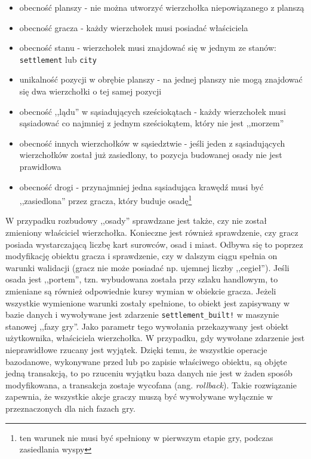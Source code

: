 \documentclass[11pt,twoside]{report}
\begin{document}
\begin{itemize}
\item obecność planszy - nie można utworzyć wierzchołka niepowiązanego
  z planszą
\item obecność gracza - każdy wierzchołek musi posiadać właściciela
\item obecność stanu - wierzchołek musi znajdować się w jednym ze
  stanów: \texttt{settlement} lub \texttt{city}
\item unikalność pozycji w obrębie planszy - na jednej planszy nie
  mogą znajdować się dwa wierzchołki o tej samej pozycji
\item obecność ,,lądu'' w sąsiadujących sześciokątach - każdy
  wierzchołek musi sąsiadować co najmniej z jednym sześciokątem, który
  nie jest ,,morzem''
\item obecność innych wierzchołków w sąsiedztwie - jeśli jeden z
  sąsiadujących wierzchołków został już zasiedlony, to pozycja
  budowanej osady nie jest prawidłowa
\item obecność drogi - przynajmniej jedna sąsiadująca krawędź musi być
  ,,zasiedlona'' przez gracza, który buduje osadę\footnote{ten warunek
    nie musi być spełniony w pierwszym etapie gry, podczas
    zasiedlania wyspy}
\end{itemize}

W przypadku rozbudowy ,,osady'' sprawdzane jest także, czy nie został
zmieniony właściciel wierzchołka. Konieczne jest również sprawdzenie,
czy gracz posiada wystarczającą liczbę kart surowców, osad i
miast. Odbywa się to poprzez modyfikację obiektu gracza i sprawdzenie,
czy w dalszym ciągu spełnia on warunki walidacji (gracz nie może
posiadać np. ujemnej liczby ,,cegieł''). Jeśli osada jest ,,portem'',
tzn. wybudowana została przy szlaku handlowym, to zmieniane są również
odpowiednie kursy wymian w obiekcie gracza. Jeżeli wszystkie
wymienione warunki zostały spełnione, to obiekt jest zapisywany w
bazie danych i wywoływane jest zdarzenie \texttt{settlement\_built!} w
maszynie stanowej ,,fazy gry''. Jako parametr tego wywołania
przekazywany jest obiekt użytkownika, właściciela wierzchołka. W
przypadku, gdy wywołane zdarzenie jest nieprawidłowe rzucany jest
wyjątek. Dzięki temu, że wszystkie operacje bazodanowe, wykonywane
przed lub po zapisie właściwego obiektu, są objęte jedną transakcją,
to po rzuceniu wyjątku baza danych nie jest w żaden sposób
modyfikowana, a transakcja zostaje wycofana
(ang. \emph{rollback}). Takie rozwiązanie zapewnia, że wszystkie akcje
graczy muszą być wywoływane wyłącznie w przeznaczonych dla nich fazach
gry.
\end{document}
